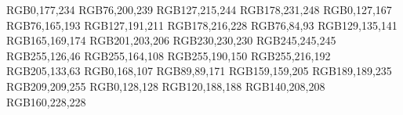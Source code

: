 \usepackage{xcolor}									%
\usepackage{color} 									%

\definecolor{blue1}		{RGB}{0,177,234}				%
\definecolor{blue2}		{RGB}{76,200,239}				%
\definecolor{blue3}		{RGB}{127,215,244}				%
\definecolor{blue4}		{RGB}{178,231,248}				%
\definecolor{bluegray1}	{RGB}{0,127,167}				%
\definecolor{bluegray2}	{RGB}{76,165,193}				%
\definecolor{bluegray3}	{RGB}{127,191,211}				%
\definecolor{bluegray4}	{RGB}{178,216,228}				%
\definecolor{gray1}		{RGB}{76,84,93}				%
\definecolor{gray2}		{RGB}{129,135,141}				%
\definecolor{gray3}		{RGB}{165,169,174}				%
\definecolor{gray4}		{RGB}{201,203,206}				%
\definecolor{gray5}		{RGB}{230,230,230}				%
\definecolor{gray6}		{RGB}{245,245,245}				%
\definecolor{orange1}	{RGB}{255,126,46}				%
\definecolor{orange2}	{RGB}{255,164,108}				%
\definecolor{orange3}	{RGB}{255,190,150}				%
\definecolor{orange4}	{RGB}{255,216,192}				%
\definecolor{brown1}		{RGB}{205,133,63}				%
\definecolor{green1}		{RGB}{0,168,107}				%
\definecolor{purple1}		{RGB}{89,89,171}				%
\definecolor{purple2}		{RGB}{159,159,205}				%
\definecolor{purple3}		{RGB}{189,189,235}				%
\definecolor{purple4}		{RGB}{209,209,255}				%
\definecolor{teal1}		{RGB}{0,128,128}				%
\definecolor{teal2}		{RGB}{120,188,188}				%
\definecolor{teal3}		{RGB}{140,208,208}				%
\definecolor{teal4}		{RGB}{160,228,228}				%

\def\smallopacity	{0.7}								%
\def\bigopacity		{0.5}								%
\def\verybigopacity	{0.3}								%

\newcommand{\tikzscaleforoneplot}		{1.0}						%
\newcommand{\tikzscalefortwoplots}		{0.8}						%
\newcommand{\tikzscaleforthreeplots}	{0.675}					%
\newcommand{\tikzwidthforoneplot}		{.65\textwidth}				%
\newcommand{\tikzheightforoneplot}		{.4\textwidth}				%
\tikzset{font=\small}											%

